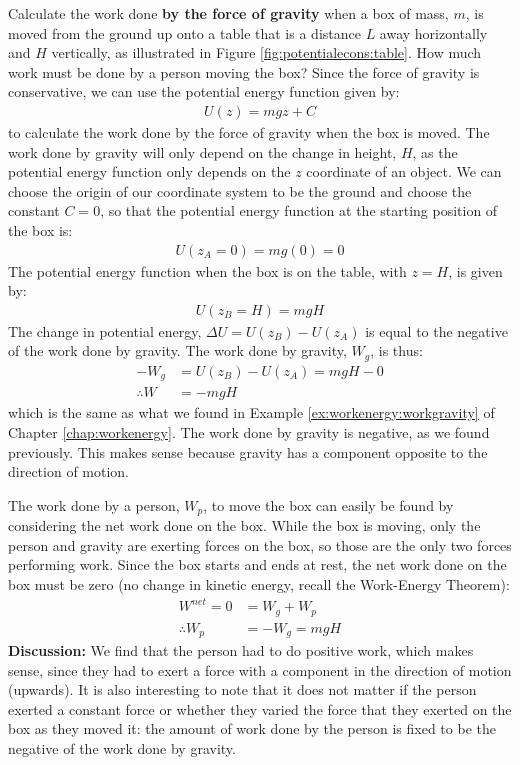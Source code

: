 \begin{example}{
Calculate the work done \textbf{by the force of gravity} when a box of mass, $m$, is moved from the ground up onto a table that is a distance $L$ away horizontally and $H$ vertically, as illustrated in Figure \ref{fig:potentialecons:table}. How much work must be done by a person moving the box?}
Since the force of gravity is conservative, we can use the potential energy function given by:
\begin{align*}
U(z)=mgz+C
\end{align*}
to calculate the work done by the force of gravity when the box is moved. The work done by gravity will only depend on the change in height, $H$, as the potential energy function only depends on the $z$ coordinate of an object.  We can choose the origin of our coordinate system to be the ground and choose the constant $C=0$, so that the potential energy function at the starting position of the box is:
\begin{align*}
U(z_A=0) = mg(0)= 0
\end{align*}
The potential energy function when the box is on the table, with $z=H$, is given by:
\begin{align*}
U(z_B=H) = mgH
\end{align*}
The change in potential energy, $\Delta U = U(z_B) - U(z_A)$ is equal to the negative of the work done by gravity. The work done by gravity, $W_g$, is thus:
\begin{align*}
-W_g &=  U(z_B) - U(z_A) = mgH - 0\\
\therefore W &= -mgH
\end{align*}
which is the same as what we found in Example \ref{ex:workenergy:workgravity} of Chapter \ref{chap:workenergy}. The work done by gravity is negative, as we found previously. This makes sense because gravity has a component opposite to the direction of motion.  

The work done by a person, $W_p$, to move the box can easily be found by considering the net work done on the box. While the box is moving, only the person and gravity are exerting forces on the box, so those are the only two forces performing work. Since the box starts and ends at rest, the net work done on the box must be zero (no change in kinetic energy, recall the Work-Energy Theorem):
\begin{align*}
W^{net} = 0 &= W_g + W_p\\
\therefore W_p &= -W_g = mgH
\end{align*}
\textbf{Discussion:} We find that the person had to do positive work, which makes sense, since they had to exert a force with a component in the direction of motion (upwards). It is also interesting to note that it does not matter if the person exerted a constant force or whether they varied the force that they exerted on the box as they moved it: the amount of work done by the person is fixed to be the negative of the work done by gravity.
\end{example}
